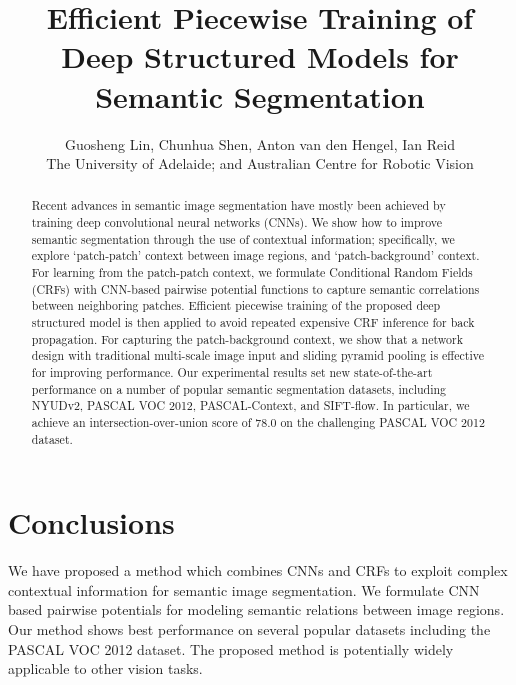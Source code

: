 \documentclass[10pt,twocolumn,letterpaper]{article}
\begin{document}
%

\title{Efficient Piecewise Training of Deep Structured Models  for Semantic Segmentation}

\author{Guosheng Lin, \;  Chunhua Shen, \;
Anton van den Hengel, \; Ian Reid\\
The University of Adelaide; and Australian Centre for Robotic Vision\\
}

\maketitle
%




%
\begin{abstract}
   Recent advances in  semantic image segmentation have mostly been achieved by
  training deep convolutional neural networks (CNNs).
  We show how to improve semantic segmentation through the use of contextual information;
	specifically, we explore `patch-patch' context between image regions, and `patch-background' context.
  For learning from the patch-patch context,
 we formulate Conditional Random Fields (CRFs) with CNN-based pairwise potential functions to capture semantic correlations between neighboring patches.
  Efficient piecewise training of the proposed deep structured model is then applied to avoid repeated expensive CRF inference
  for back propagation.
   For capturing the patch-background context, we show that a network design
   with traditional multi-scale image input and sliding pyramid pooling is effective for improving performance.
	Our experimental results set new state-of-the-art performance on a number of
    popular semantic segmentation datasets, including NYUDv2, PASCAL VOC 2012, PASCAL-Context, and SIFT-flow.
	In particular, we achieve an intersection-over-union score of $78.0$ on the challenging PASCAL VOC 2012 dataset.
\end{abstract}








\section{Conclusions}

We have proposed a method which combines CNNs and CRFs to exploit complex
contextual information for semantic image segmentation.
We formulate CNN based pairwise potentials for modeling
semantic relations between image regions.
Our method shows best performance on several popular datasets including the PASCAL VOC 2012 dataset.
The proposed method is potentially widely applicable to other vision tasks.
\end{document}
